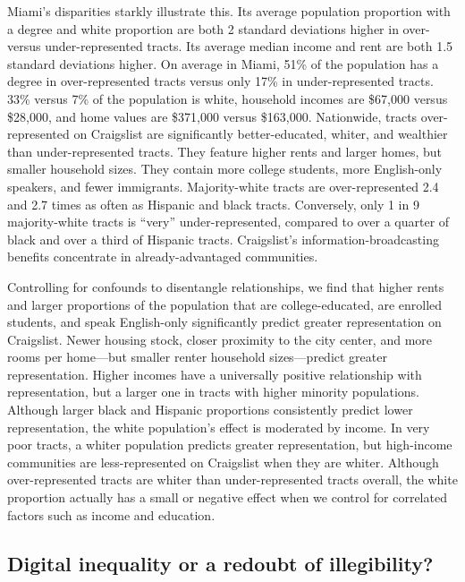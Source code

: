 \documentclass[11pt,letterpaper]{article}
\begin{document}
Miami's disparities starkly illustrate this. Its average population proportion with a degree and white proportion are both 2 standard deviations higher in over- versus under-represented tracts. Its average median income and rent are both 1.5 standard deviations higher. On average in Miami, 51\% of the population has a degree in over-represented tracts versus only 17\% in under-represented tracts. 33\% versus 7\% of the population is white, household incomes are \$67,000 versus \$28,000, and home values are \$371,000 versus \$163,000. Nationwide, tracts over-represented on Craigslist are significantly better-educated, whiter, and wealthier than under-represented tracts. They feature higher rents and larger homes, but smaller household sizes. They contain more college students, more English-only speakers, and fewer immigrants. Majority-white tracts are over-represented 2.4 and 2.7 times as often as Hispanic and black tracts. Conversely, only 1 in 9 majority-white tracts is \enquote{very} under-represented, compared to over a quarter of black and over a third of Hispanic tracts. Craigslist's information-broadcasting benefits concentrate in already-advantaged communities.

Controlling for confounds to disentangle relationships, we find that higher rents and larger proportions of the population that are college-educated, are enrolled students, and speak English-only significantly predict greater representation on Craigslist. Newer housing stock, closer proximity to the city center, and more rooms per home---but smaller renter household sizes---predict greater representation. Higher incomes have a universally positive relationship with representation, but a larger one in tracts with higher minority populations. Although larger black and Hispanic proportions consistently predict lower representation, the white population's effect is moderated by income. In very poor tracts, a whiter population predicts greater representation, but high-income communities are less-represented on Craigslist when they are whiter. Although over-represented tracts are whiter than under-represented tracts overall, the white proportion actually has a small or negative effect when we control for correlated factors such as income and education.

\subsection{Digital inequality or a redoubt of illegibility?}
\end{document}
